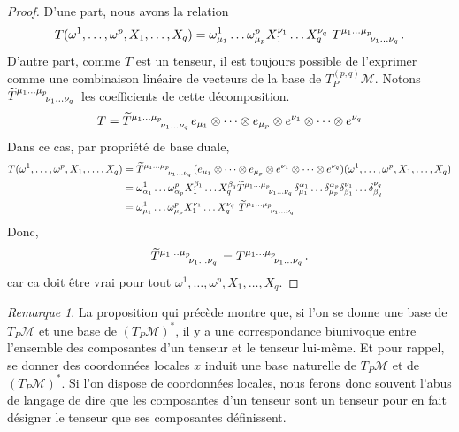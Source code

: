 \documentclass[a4paper,11pt]{report}
\theoremstyle{definition}
\theoremstyle{plain}
\theoremstyle{definition}
\theoremstyle{remark}
\newtheorem{rmk}{Remarque}[chapter]
\newcommand{\M}{\mathscr{M}}
\begin{document}
                \begin{proof}
                    D'une part, nous avons la relation
                    \begin{equation}
                         T(\omega^1,\dots,\omega^p,X_1,\dots,X_q) = \omega^1_{\mu_1}\dots\omega^p_{\mu_p}X^{\nu_1}_1\dots X^{\nu_q}_q~ T\indices{^{\mu_1\dots\mu_p}_{\nu_1\dots\nu_q}}.
                    \end{equation}
                    D'autre part, comme $T$ est un tenseur, il est toujours possible de l'exprimer comme une combinaison linéaire de vecteurs de la base de $T^{(p,q)}_P\M$. Notons $\widetilde{T}\indices{^{\mu_1\dots\mu_p}_{\nu_1\dots\nu_q}}$ les coefficients de cette décomposition.
                    \begin{equation}
                        T = \widetilde{T}\indices{^{\mu_1\dots\mu_p}_{\nu_1\dots\nu_q}} e_{\mu_1}\otimes\dots\otimes e_{\mu_p}\otimes e^{\nu_1}\otimes\dots\otimes e^{\nu_q}
                    \end{equation}
                    Dans ce cas, par propriété de base duale,
                    \begin{align}
                        T(\omega^1,\dots,\omega^p,X_1,\dots,X_q) &= \widetilde{T}\indices{^{\mu_1\dots\mu_p}_{\nu_1\dots\nu_q}} (e_{\mu_1}\otimes\dots\otimes e_{\mu_p}\otimes e^{\nu_1}\otimes\dots\otimes e^{\nu_q})(\omega^1,\dots,\omega^p,X_1,\dots,X_q)\\
                        &= \omega^1_{\alpha_1}\dots\omega^p_{\alpha_p}X^{\beta_1}_1\dots X^{\beta_q}_q \widetilde{T}\indices{^{\mu_1\dots\mu_p}_{\nu_1\dots\nu_q}} \delta^{\alpha_1}_{\mu_1}\dots\delta^{\alpha_p}_{\mu_p}\delta^{\nu_1}_{\beta_1}\dots\delta^{\nu_q}_{\beta_q}\\
                        &= \omega^1_{\mu_1}\dots\omega^p_{\mu_p}X^{\nu_1}_1\dots X^{\nu_q}_q~ \widetilde{T}\indices{^{\mu_1\dots\mu_p}_{\nu_1\dots\nu_q}}
                    \end{align}
                    Donc, 
                    \begin{equation}
                        \widetilde{T}\indices{^{\mu_1\dots\mu_p}_{\nu_1\dots\nu_q}} = T\indices{^{\mu_1\dots\mu_p}_{\nu_1\dots\nu_q}}.
                    \end{equation}
                    car ca doit être vrai pour tout $\omega^1,\dots,\omega^p,X_1,\dots,X_q$.
                \end{proof}
                
                \begin{rmk}
                    La proposition qui précède montre que, si l'on se donne une base de $T_P\M$ et une base de $(T_P\M)^*$, il y a une correspondance biunivoque entre l'ensemble des composantes d'un tenseur et le tenseur lui-même. Et pour rappel, se donner des coordonnées locales $x$ induit une base naturelle de $T_P\M$ et de $(T_P\M)^*$. Si l'on dispose de coordonnées locales, nous ferons donc souvent l'abus de langage de dire que les composantes d'un tenseur sont un tenseur pour en fait désigner le tenseur que ses composantes définissent.
                \end{rmk}
                
\end{document}
